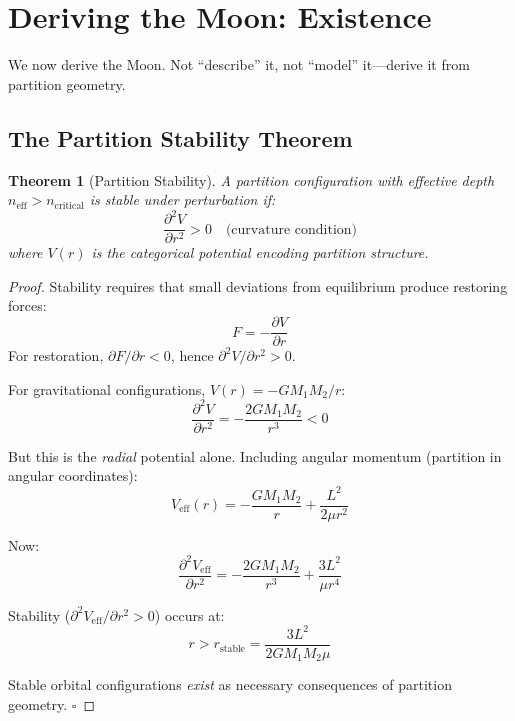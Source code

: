 \documentclass[12pt,a4paper]{article}
\newtheorem{theorem}{Theorem}[section]
\theoremstyle{definition}
\theoremstyle{remark}
\begin{document}
\section{Deriving the Moon: Existence}
\label{sec:existence}

We now derive the Moon. Not ``describe'' it, not ``model'' it---derive it from partition geometry.

\subsection{The Partition Stability Theorem}

\begin{theorem}[Partition Stability]
\label{thm:stability}
A partition configuration with effective depth $n_{\text{eff}} > n_{\text{critical}}$ is stable under perturbation if:
\begin{equation}
\frac{\partial^2 V}{\partial r^2} > 0 \quad \text{(curvature condition)}
\end{equation}
where $V(r)$ is the categorical potential encoding partition structure.
\end{theorem}

\begin{proof}
Stability requires that small deviations from equilibrium produce restoring forces:
\begin{equation}
F = -\frac{\partial V}{\partial r}
\end{equation}
For restoration, $\partial F/\partial r < 0$, hence $\partial^2 V/\partial r^2 > 0$.

For gravitational configurations, $V(r) = -GM_1 M_2/r$:
\begin{equation}
\frac{\partial^2 V}{\partial r^2} = -\frac{2GM_1 M_2}{r^3} < 0
\end{equation}

But this is the \emph{radial} potential alone. Including angular momentum (partition in angular coordinates):
\begin{equation}
V_{\text{eff}}(r) = -\frac{GM_1 M_2}{r} + \frac{L^2}{2\mu r^2}
\end{equation}

Now:
\begin{equation}
\frac{\partial^2 V_{\text{eff}}}{\partial r^2} = -\frac{2GM_1 M_2}{r^3} + \frac{3L^2}{\mu r^4}
\end{equation}

Stability ($\partial^2 V_{\text{eff}}/\partial r^2 > 0$) occurs at:
\begin{equation}
r > r_{\text{stable}} = \frac{3L^2}{2GM_1 M_2 \mu}
\end{equation}

Stable orbital configurations \emph{exist} as necessary consequences of partition geometry. $\square$
\end{proof}
\end{document}
